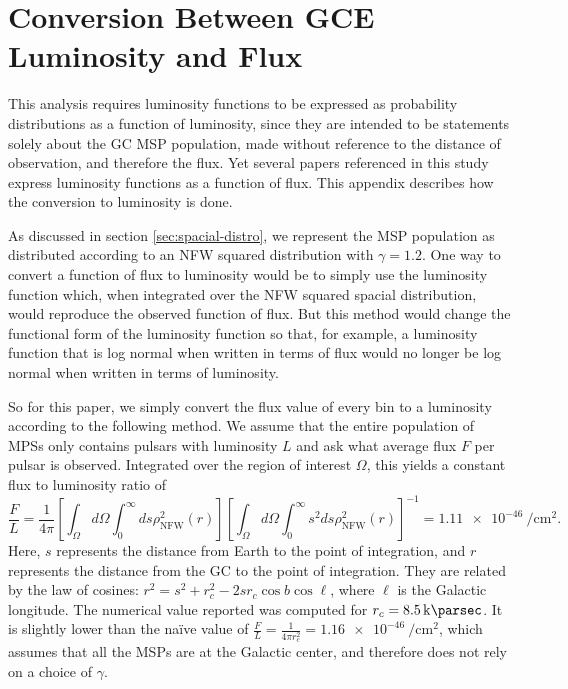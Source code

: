 \documentclass[a4paper,11pt]{article}
\newcommand{\brackets}[1]{\left[#1\right]}
\newcommand{\comment}[1]{\emph{\color{red}{#1}}}
\begin{document}
\section{Conversion Between GCE Luminosity and Flux}
\label{app:lum-to-flux}
This analysis requires luminosity functions to be expressed as probability distributions as a function of luminosity, since they are intended to be statements solely about the GC MSP population, made without reference to the distance of observation, and therefore the flux. Yet several papers referenced in this study express luminosity functions as a function of flux. This appendix describes how the conversion to luminosity is done.

As discussed in section \ref{sec:spacial-distro}, we represent the MSP population as distributed according to an NFW squared distribution with $\gamma = 1.2$. One way to convert a function of flux to luminosity would be to simply use the luminosity function which, when integrated over the NFW squared spacial distribution, would reproduce the observed function of flux. But this method would change the functional form of the luminosity function so that, for example, a luminosity function that is log normal when written in terms of flux would no longer be log normal when written in terms of luminosity. \comment{Is it worth devoting a whole paragraph to describing something I do not intend to do? I do it to avoid confusion.}

So for this paper, we simply convert the flux value of every bin to a luminosity according to the following method. We assume that the entire population of MPSs only contains pulsars with luminosity $L$ and ask what average flux $F$ per pulsar is observed. Integrated over the region of interest $\Omega$, this yields a constant flux to luminosity ratio of
\begin{equation}
    \frac{F}{L} = \frac{1}{4\pi}\brackets{\int_{\Omega}d\Omega\int_0^\infty ds \rho_\text{NFW}^2 (r)}\brackets{\int_{\Omega}d\Omega \int_0^\infty s^2 ds \rho_\text{NFW}^2 (r)}^{-1} = \SI{1.11e-46}{\per\centi\meter\squared}.
    \label{eqn:f-to-l}
\end{equation}
Here, $s$ represents the distance from Earth to the point of integration, and $r$ represents the distance from the GC to the point of integration. They are related by the law of cosines: $r^2 = s^2 + r_c^2 - 2s r_c \cos b\cos \ell$, where $\ell$ is the Galactic longitude. The numerical value reported was computed for $r_c = \SI{8.5}{\kilo\parsec}$. It is slightly lower than the na\"ive value of $\frac{F}{L} = \frac{1}{4\pi r_c^2} = \SI{1.16e-46}{\per\centi\meter\squared}$, which assumes that all the MSPs are at the Galactic center, and therefore does not rely on a choice of $\gamma$.
\end{document}
